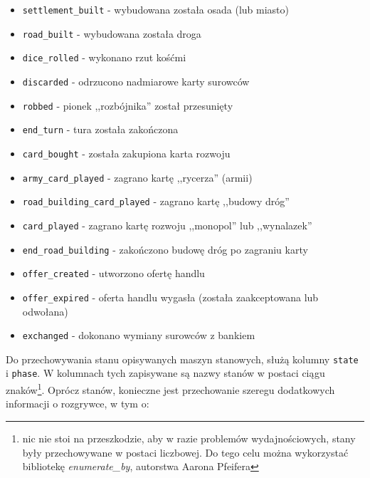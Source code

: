 \documentclass[11pt,twoside]{report}
\begin{document}
\begin{itemize}
\item \texttt{settlement\_built} - wybudowana została osada (lub miasto)
\item \texttt{road\_built} - wybudowana została droga
\item \texttt{dice\_rolled} - wykonano rzut kośćmi
\item \texttt{discarded} - odrzucono nadmiarowe karty surowców
\item \texttt{robbed} - pionek ,,rozbójnika'' został przesunięty
\item \texttt{end\_turn} - tura została zakończona
\item \texttt{card\_bought} - została zakupiona karta rozwoju
\item \texttt{army\_card\_played} - zagrano kartę ,,rycerza'' (armii)
\item \texttt{road\_building\_card\_played} - zagrano kartę ,,budowy
  dróg''
\item \texttt{card\_played} - zagrano kartę rozwoju ,,monopol'' lub
  ,,wynalazek''
\item \texttt{end\_road\_building} - zakończono budowę dróg po
  zagraniu karty
\item \texttt{offer\_created} - utworzono ofertę handlu
\item \texttt{offer\_expired} - oferta handlu wygasła (została
  zaakceptowana lub odwołana)
\item \texttt{exchanged} - dokonano wymiany surowców z bankiem
\end{itemize}

Do przechowywania stanu opisywanych maszyn stanowych, służą kolumny
\texttt{state} i \texttt{phase}. W kolumnach tych zapisywane są nazwy
stanów w postaci ciągu znaków\footnote{nic nie stoi na przeszkodzie,
  aby w razie problemów wydajnościowych, stany były przechowywane w
  postaci liczbowej. Do tego celu można wykorzystać bibliotekę
  \emph{enumerate\_by}, autorstwa Aarona Pfeifera}. Oprócz stanów,
konieczne jest przechowanie szeregu dodatkowych informacji o
rozgrywce, w tym o:
\end{document}
